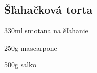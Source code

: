 \setcounter{step}{0}
\subsection{Šľahačková torta}

\begin{ingredient}
\begin{main}
	\item 330ml smotana na šľahanie
	\item 250g mascarpone
	\item 500g salko
\end{main}
\end{ingredient}%
\begin{recipe}


\end{recipe}

\begin{notes}

\end{notes}	
